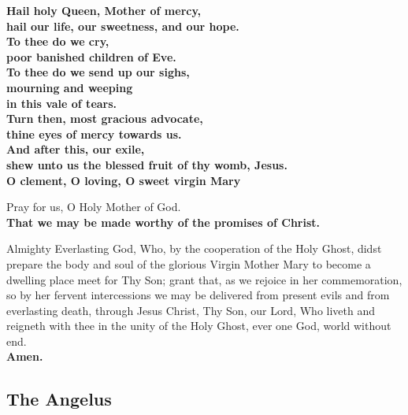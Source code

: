 \textbf{Hail holy Queen, Mother of mercy,\\
hail our life, our sweetness, and our hope.\\
To thee do we cry,\\
poor banished children of Eve.\\
To thee do we send up our sighs,\\
mourning and weeping\\
in this vale of tears.\\
Turn then, most gracious advocate,\\
thine eyes of mercy towards us.\\
And after this, our exile,\\
shew unto us the blessed fruit of thy womb, Jesus.\\
O clement, O loving, O sweet virgin Mary}

Pray for us, O Holy Mother of God.\\
\textbf{That we may be made worthy of the promises of Christ.}

Almighty Everlasting God, Who, by the cooperation of the Holy Ghost, didst prepare the body and soul of the
glorious Virgin Mother Mary to become a dwelling place meet for Thy Son;
grant that, as we rejoice in her commemoration, so by her fervent intercessions we may be delivered from present evils and from everlasting death,
through Jesus Christ, Thy Son, our Lord, Who liveth and reigneth with thee in the unity of the Holy Ghost, ever one God, world without end.\\
\textbf{Amen.}

\clearpage

\subsection{The Angelus}






